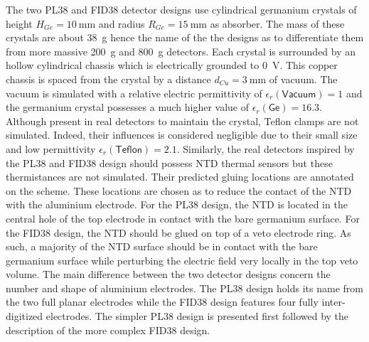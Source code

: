 The two PL38 and FID38 detector designs use cylindrical germanium crystals of height $H_{Ge} = \SI{10}{\mm}$ and radius $R_{Ge} = \SI{15}{\mm}$ as absorber. The mass of these crystals are about \SI{38}{\g} hence the name of the the designs as to differentiate them from more massive \SI{200}{\g} and \SI{800}{\g} \Edelweiss{} detectors. Each crystal is surrounded by an hollow cylindrical chassis which is electrically grounded to \SI{0}{\volt}. This copper chassis is spaced from the crystal by a distance $d_{Cu} = \SI{3}{\mm}$ of vacuum.
The vacuum is simulated with a relative electric permittivity of $\epsilon_r(\textsf{Vacuum}) = 1$ and the germanium crystal possesses a much higher value of $\epsilon_r (\textsf{Ge}) = 16.3$. Although present in real detectors to maintain the crystal, Teflon clamps are not simulated. Indeed, their influences is considered negligible due to their small size and low permittivity $\epsilon_r(\textsf{Teflon})=2.1$.
Similarly, the real detectors inspired by the PL38 and FID38 design should possess NTD thermal sensors but these thermistances are not simulated. Their predicted gluing locations are annotated on the scheme. These locations are chosen as to reduce the contact of the NTD with the aluminium electrode. For the PL38 design, the NTD is located in the central hole of the top electrode in contact with the bare germanium surface. For the FID38 design, the NTD should be glued on top of a veto electrode ring. As such, a majority of the NTD surface should be in contact with the bare germanium surface while perturbing the electric field very locally in the top veto volume.
The main difference between the two detector designs concern the number and shape of aluminium electrodes. The PL38 design holds its name from the two full planar electrodes while the FID38 design features four fully inter-digitized electrodes. The simpler PL38 design is presented first followed by the description of the more complex FID38 design.


